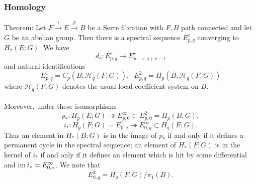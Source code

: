 \documentclass[11pt]{article}
\begin{document}
\begin{Jandr SSS notes}
	\subsubsection{Homology}
Theorem: Let $F\overset{i}{\to} E\overset{p}{\to} B$ be a Serre fibration with $F,B$ path connected and let $G$ be an abelian group. Then there is a spectral sequence $E^r_{p,q}$ converging to $H_*(E;G)$. We have
\[d_r:E^r_{p,q}\to E^r_{p-r,q+r-1}\]
and natural identifications
\[E^1_{p,q}=C_p(B;\mathscr{H}_q(F;G)),
\hspace{7pt}
E^2_{p,q}=H_p(B;\mathscr{H}_q(F;G))\]
where $\mathscr{H}_q(F;G)$ denotes the usual local coefficient system on $B$.\\
\\
Moreover, under these isomorphisms
\[p_*:H_p(E;G)\twoheadrightarrow E^{\infty}_{p,0}\subset E^2_{p,0}=H_p(B;G),\]
\[i_*:H_q(F;G)=E^1_{0,q}\twoheadrightarrow E^{\infty}_{0,q}\subset H_q(E;G).\]
Thus an element in $H_*(B;G)$ is in the image of $p_*$ if and only if it defines a permanent cycle in the spectral sequence; an element of $H_*(F;G)$ is in the kernel of $i_*$ if and only if it defines an element which is hit by some differential and $\operatorname{im} i_*=E^{\infty}_{0,*}$. We note that
\[E^2_{0,q}=H_q(F;G)/\pi_1(B).\]



\end{Jandr SSS notes}
\end{document}
